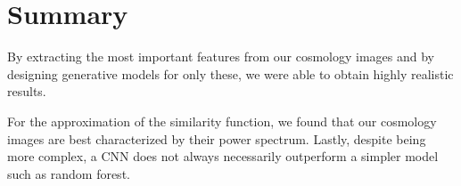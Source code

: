 \documentclass[10pt,conference,compsocconf]{IEEEtran}
\newcommand\TODO[1]{\textcolor{red}{#1}} %
\begin{document}




\section{Summary}

By extracting the most important features from our cosmology images and by designing generative models for only these, we were able to obtain highly realistic results.


For the approximation of the similarity function, we found that our cosmology images are best characterized by their power spectrum. Lastly, despite being more complex, a CNN does not always necessarily outperform a simpler model such as random forest. %



\newpage





\clearpage




\end{document}

